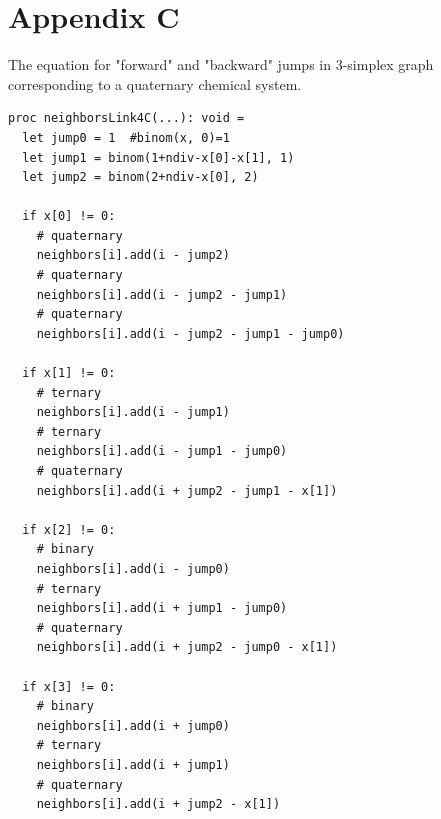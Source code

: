 \section*{Appendix C}  \label{nimplex:app3}

The equation for "forward" and "backward" jumps in 3-simplex graph corresponding to a quaternary chemical system. 

\begin{verbatim}
proc neighborsLink4C(...): void =
  let jump0 = 1  #binom(x, 0)=1
  let jump1 = binom(1+ndiv-x[0]-x[1], 1)
  let jump2 = binom(2+ndiv-x[0], 2)
  
  if x[0] != 0:
    # quaternary
    neighbors[i].add(i - jump2)
    # quaternary
    neighbors[i].add(i - jump2 - jump1)
    # quaternary
    neighbors[i].add(i - jump2 - jump1 - jump0) 
  
  if x[1] != 0:
    # ternary
    neighbors[i].add(i - jump1)    
    # ternary
    neighbors[i].add(i - jump1 - jump0)         
    # quaternary
    neighbors[i].add(i + jump2 - jump1 - x[1])  
  
  if x[2] != 0:
    # binary
    neighbors[i].add(i - jump0)     
    # ternary
    neighbors[i].add(i + jump1 - jump0)    
    # quaternary
    neighbors[i].add(i + jump2 - jump0 - x[1])  
  
  if x[3] != 0:
    # binary
    neighbors[i].add(i + jump0)        
    # ternary
    neighbors[i].add(i + jump1)          
    # quaternary     
    neighbors[i].add(i + jump2 - x[1])              
\end{verbatim}

\printbibliography[heading=subbibintoc]
